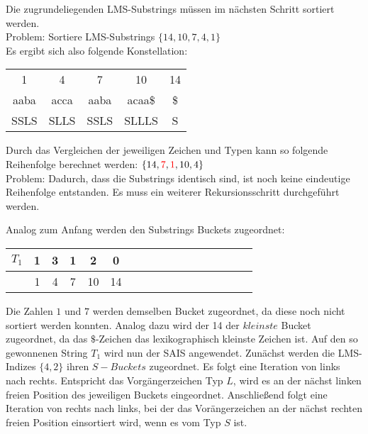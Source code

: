 \noindent Die zugrundeliegenden LMS-Substrings müssen im nächsten Schritt sortiert werden. \\
\noindent Problem: Sortiere LMS-Substrings $\{14, 10, 7, 4, 1\}$ \\

\noindent Es ergibt sich also folgende Konstellation:

\begin{center}
	\begin{tabular}{c|c|c|c|c}
			 1 	     &            4          &          7            &           10            &          14 \\
          	aaba     &          acca         &        aaba           &          acaa\$         &          \$  \\
         	SSLS     &          SLLS         &        SSLS           &          SLLLS          &           S
	\end{tabular}
\end{center}
\bigskip

\noindent Durch das Vergleichen der jeweiligen Zeichen und Typen kann so folgende Reihenfolge berechnet werden: $\{14, \textcolor{red}{7}, \textcolor{red}{1}, 10, 4\}$ \\
\noindent Problem: Dadurch, dass die Substrings identisch sind, ist noch keine eindeutige Reihenfolge entstanden. Es muss ein weiterer Rekursionsschritt durchgeführt werden.

\newpage \noindent Analog zum Anfang werden den Substrings Buckets zugeordnet:

\begin{center}
  \begin{tabular}{ | l | c | c | c | c | c | c | c | c | c | c | c | c | c | c | c | c | }
    \hline
        $T_1$ & 1 & 3 & 1 & 2 & 0 \\ \hline
              & 1 & 4 & 7 & 10 & 14  \\
    \hline
  \end{tabular}
\end{center}
\bigskip

\noindent Die Zahlen $1$ und $7$ werden demselben Bucket zugeordnet, da diese noch nicht sortiert werden konnten. Analog dazu wird der 14 der $kleinste$ Bucket zugeordnet, da das $\$$-Zeichen das lexikographisch kleinste Zeichen ist. Auf den so gewonnenen String $T_1$ wird nun der SAIS angewendet. Zunächst werden die LMS-Indizes $\{4, 2\}$ ihren $S-Buckets$ zugeordnet. Es folgt eine Iteration von links nach rechts. Entspricht das Vorgängerzeichen Typ $L$, wird es an der nächst linken freien Position des jeweiligen Buckets eingeordnet. Anschließend folgt eine Iteration von rechts nach links, bei der das Vorängerzeichen an der nächst rechten freien Position einsortiert wird, wenn es vom Typ $S$ ist.


